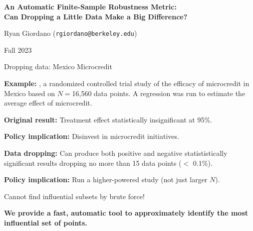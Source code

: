 
\begin{frame}

\begin{center}
\large
\textbf{
An Automatic Finite-Sample Robustness Metric:
\\Can Dropping a Little Data Make a Big Difference?}
\end{center}

\hrulefill
\vspace{1em}

Ryan Giordano (\texttt{rgiordano@berkeley.edu})\footnotemark[1]

Fall 2023


\end{frame}


\begin{frame}[t]{Dropping data: Mexico Microcredit}


\vspace{1em} \textbf{Example:} \citet{angelucci2015microcredit}, a randomized
controlled trial study of the efficacy of microcredit in Mexico based on $N =
$16,560 data points. A regression was run to estimate the average effect of
microcredit.

\hrulefill

\vspace{1em}
\textbf{Original result: }
Treatment effect statistically insignificant at 95\%.

\vspace{1em}
\textbf{Policy implication: } Disinvest in microcredit initiatives.

\hrulefill

\pause

\vspace{1em} \textbf{Data dropping: } Can produce both positive and negative
statististically significant results dropping no more than 15 data points
($<$ 0.1\%).

\vspace{1em}
\textbf{Policy implication: } Run a higher-powered study (not just
larger $N$).


\hrulefill

\pause

Cannot find influential subsets by brute force!

\vspace{1em}
\textbf{We provide a fast, automatic tool to  approximately identify the
most influential set of points.}


\end{frame}


